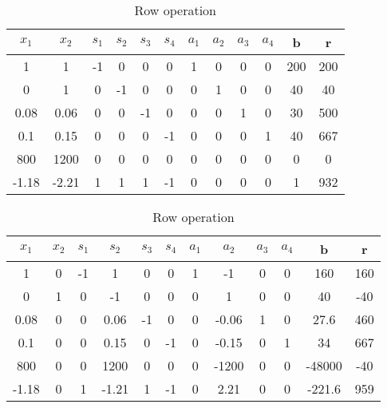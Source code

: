 \documentclass{article}
\begin{document}
    \begin{table}[H]
  \centering
  \caption{Row operation}
  \label{my-label}
  \begin{tabular}{|c|c|c|c|c|c|c|c|c|c|c|c|}
  \hline
  $x_1$ & $x_2$ & $s_1$  & $s_2$ & $s_3$ & $s_4$ & $a_1$ & $a_2$ & $a_3$ & $a_4$ & b & r  \\ \hline
  1    & 1    & -1       & 0    & 0    & 0    & 1    & 0    & 0    & 0 & 200  & 200\\ \hline
  0    & 1    & 0        & -1   & 0    & 0    & 0    & 1    & 0    & 0 & 40   & 40\\ \hline
  0.08 & 0.06 & 0        & 0    & -1   & 0    & 0    & 0    & 1    & 0 & 30   & 500\\ \hline
  0.1  & 0.15 & 0        & 0    & 0    & -1   & 0    & 0    & 0    & 1 & 40   & 667\\ \hline
  800  & 1200 & 0        & 0    & 0    & 0    & 0    & 0    & 0    & 0 & 0    & 0\\ \hline
  -1.18 & -2.21  & 1     & 1    & 1    & -1   & 0    & 0    & 0    & 0    & 1 & 932   \\ \hline
  \end{tabular}
  \end{table}

  \begin{table}[H]
  \centering
  \caption{Row operation}
  \label{my-label}
  \begin{tabular}{|c|c|c|c|c|c|c|c|c|c|c|c|}
  \hline
  $x_1$ & $x_2$ & $s_1$  & $s_2$ & $s_3$ & $s_4$ & $a_1$ & $a_2$ & $a_3$ & $a_4$ & b & r  \\ \hline
  1    & 0      & -1       & 1       & 0    & 0    & 1    & -1    & 0    & 0 & 160  & 160\\ \hline
  0    & 1      & 0        & -1      & 0    & 0    & 0    & 1    & 0    & 0 & 40   & -40\\ \hline
  0.08 & 0      & 0        & 0.06    & -1   & 0    & 0    & -0.06    & 1    & 0 & 27.6 & 460\\ \hline
  0.1  & 0      & 0        & 0.15    & 0    & -1   & 0    & -0.15    & 0    & 1 & 34   & 667\\ \hline
  800  & 0      & 0        & 1200    & 0    & 0    & 0    & -1200     & 0    & 0 & -48000 & -40\\ \hline
  -1.18 &0      & 1        & -1.21   & 1    & -1   & 0    & 2.21   & 0    & 0 & -221.6 & 959   \\ \hline
  \end{tabular}
  \end{table}
\end{document}
